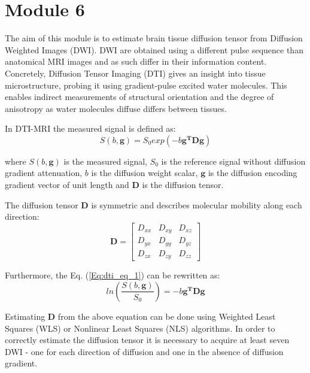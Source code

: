 \section{Module 6}

The aim of this module is to estimate brain tissue diffusion tensor from Diffusion Weighted Images (DWI). DWI are obtained using a different pulse sequence than anatomical MRI images and as such differ in their information content. Concretely, Diffusion Tensor Imaging (DTI) gives an insight into tissue microstructure, probing it using gradient-pulse excited water molecules. This enables indirect measurements of structural orientation and the degree of anisotropy as water molecules diffuse differs between tissues.

In DTI-MRI the measured signal is defined as:
\begin{equation}
S\left(b,\boldsymbol{g}\right) =  S_{0} exp\left(-b\boldsymbol{g^TDg}\right)
\label{Eq:dti_eq_1}
\end{equation}

where $S\left(b,\boldsymbol{g}\right)$ is the measured signal, $S_{0}$ is the reference signal without diffusion gradient attenuation, $b$ is the diffusion weight scalar, $\boldsymbol{g}$ is the diffusion encoding gradient vector of unit length and $\boldsymbol{D}$ is the diffusion tensor. 

The diffusion tensor $\boldsymbol{D}$ is symmetric and describes molecular mobility along each direction:
\begin{equation}
\boldsymbol{D}=
\begin{bmatrix}
D_{xx} & D_{xy} & D_{xz} \\
D_{yx} & D_{yy} & D_{yz} \\
D_{zx} & D_{zy} & D_{zz} 
\end{bmatrix}
\label{Eq:dti_eq_2}
\end{equation}

Furthermore, the Eq. (\ref{Eq:dti_eq_1}) can be rewritten as:
\begin{equation}
ln\left(\dfrac{S\left(b,\boldsymbol{g}\right)}{S_{0}}\right) = -b\boldsymbol{g^TDg}
\label{Eq:dti_eq_3}
\end{equation}

Estimating $\boldsymbol{D}$ from the above equation can be done using Weighted Least Squares (WLS) or Nonlinear Least Squares (NLS) algorithms. In order to correctly estimate the diffusion tensor it is necessary to acquire at least seven DWI - one for each direction of diffusion and one in the absence of diffusion gradient.

